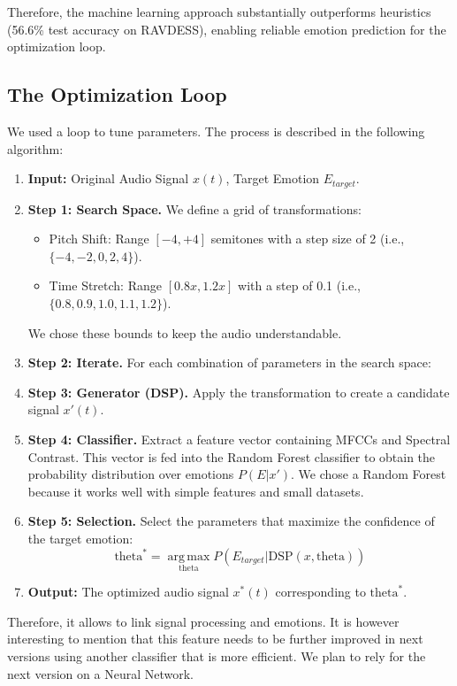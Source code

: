 \documentclass[12pt,letterpaper]{article}
\begin{document}
Therefore, the machine learning approach substantially outperforms heuristics (56.6\% test accuracy on RAVDESS), enabling reliable emotion prediction for the optimization loop.

\subsection{The Optimization Loop}
We used a loop to tune parameters. The process is described in the following algorithm:

\begin{enumerate}
    \item \textbf{Input:} Original Audio Signal $x(t)$, Target Emotion $E_{target}$.
    \item \textbf{Step 1: Search Space.} We define a grid of transformations:
    \begin{itemize}
        \item Pitch Shift: Range $[-4, +4]$ semitones with a step size of 2 (i.e., $\{-4, -2, 0, 2, 4\}$).
        \item Time Stretch: Range $[0.8x, 1.2x]$ with a step of 0.1 (i.e., $\{0.8, 0.9, 1.0, 1.1, 1.2\}$).
    \end{itemize}
    We chose these bounds to keep the audio understandable.
    \item \textbf{Step 2: Iterate.} For each combination of parameters in the search space:
    \item \textbf{Step 3: Generator (DSP).} Apply the transformation to create a candidate signal $x'(t)$.
    \item \textbf{Step 4: Classifier.} Extract a feature vector containing MFCCs and Spectral Contrast. This vector is fed into the Random Forest classifier to obtain the probability distribution over emotions $P(E|x')$. We chose a Random Forest because it works well with simple features and small datasets.
    \item \textbf{Step 5: Selection.} Select the parameters that maximize the confidence of the target emotion:
    \begin{equation}
        \text{theta}^{*} = \operatorname*{arg\,max}_{\text{theta}} P(E_{target} | \text{DSP}(x, \text{theta}))
    \end{equation}
    \item \textbf{Output:} The optimized audio signal $x^*(t)$ corresponding to $\text{theta}^*$.
\end{enumerate}

Therefore, it allows to link signal processing and emotions. It is however interesting to mention that this feature needs to be further improved in next versions using another classifier that is more efficient. We plan to rely for the next version on a Neural Network.
\end{document}
